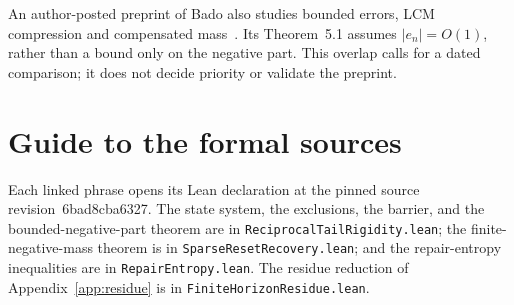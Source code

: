 \documentclass[11pt]{article}
\renewcommand{\commitshort}{6bad8cba6327}
\begin{document}
An author-posted preprint of Bado also studies bounded errors, LCM
compression and compensated mass~\cite{bado2026}.  Its Theorem~5.1 assumes
$|e_n|=O(1)$, rather than a bound only on the negative part.
This overlap calls for a dated comparison; it does not decide priority or
validate the preprint.


\section{Guide to the formal sources}\label{app:index}

Each linked phrase opens its Lean declaration at the pinned source
revision~\commitshort.  The state system, the exclusions, the barrier, and the
bounded-negative-part theorem are in \texttt{ReciprocalTailRigidity.lean}; the
finite-negative-mass theorem is in \texttt{SparseResetRecovery.lean}; and the
repair-entropy inequalities are in \texttt{RepairEntropy.lean}.  The residue
reduction of Appendix~\ref{app:residue} is in
\texttt{FiniteHorizonResidue.lean}.
\end{document}
